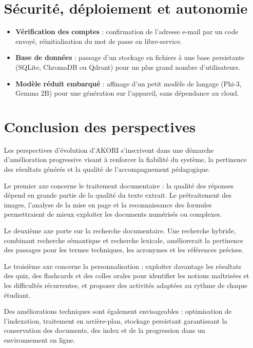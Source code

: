\documentclass[12pt,a4paper,oneside]{report}
\begin{document}
\section{Sécurité, déploiement et autonomie}

\begin{itemize}[nosep]
  \item \textbf{Vérification des comptes} : confirmation de l'adresse e-mail par un code envoyé, réinitialisation du mot de passe en libre-service.
  \item \textbf{Base de données} : passage d'un stockage en fichiers à une base persistante (SQLite, ChromaDB ou Qdrant) pour un plus grand nombre d'utilisateurs.
  \item \textbf{Modèle réduit embarqué} : affinage d'un petit modèle de langage (Phi-3, Gemma 2B) pour une génération sur l'appareil, sans dépendance au cloud.
\end{itemize}

\section{Conclusion des perspectives}

Les perspectives d'évolution d'AKORI s'inscrivent dans une démarche d'amélioration progressive visant à renforcer la fiabilité du système, la pertinence des résultats générés et la qualité de l'accompagnement pédagogique.

Le premier axe concerne le traitement documentaire : la qualité des réponses dépend en grande partie de la qualité du texte extrait. Le prétraitement des images, l'analyse de la mise en page et la reconnaissance des formules permettraient de mieux exploiter les documents numérisés ou complexes.

Le deuxième axe porte sur la recherche documentaire. Une recherche hybride, combinant recherche sémantique et recherche lexicale, améliorerait la pertinence des passages pour les termes techniques, les acronymes et les références précises.

Le troisième axe concerne la personnalisation : exploiter davantage les résultats des quiz, des flashcards et des colles orales pour identifier les notions maîtrisées et les difficultés récurrentes, et proposer des activités adaptées au rythme de chaque étudiant.

Des améliorations techniques sont également envisageables : optimisation de l'indexation, traitement en arrière-plan, stockage persistant garantissant la conservation des documents, des index et de la progression dans un environnement en ligne.
\end{document}
